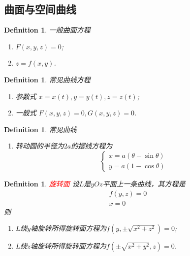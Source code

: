 \documentclass{article}
\newtheorem{definition}[theorem]{Definition}
\newcommand{\redt}[1]{\textcolor{red}{#1}}
\begin{document}
\subsection{曲面与空间曲线}

\begin{definition}
\rm 一般曲面方程
\begin{enumerate}
	\item $F(x,y,z) = 0$;
	\item $z = f(x,y)$.
\end{enumerate}
\end{definition}

\begin{definition}
\rm 常见曲线方程
\begin{enumerate}
	\item 参数式 $x = x(t),y = y(t),z = z(t)$;
	\item 一般式 $F(x,y,z) = 0, G(x,y,z) = 0$. 
\end{enumerate}
\end{definition}

\begin{definition}
\rm 常见曲线
\begin{enumerate}
	\item 转动圆的半径为$2a$的摆线方程为
	$$
		\left\{
		\begin{array}{ll}
		x = a(\theta-\sin\theta) \\
		y = a(1-\cos \theta)
		\end{array} \right.
	$$
\end{enumerate}
\end{definition}

\begin{definition}
\rm \redt{旋转面} 设$L$是$yOz$平面上一条曲线，其方程是
$$
\begin{array}{ll}
f(y,z) = 0 \\
x= 0
\end{array}
$$
则
\begin{enumerate}
	\item $L$绕$y$轴旋转所得旋转面方程为$f(y,\pm \sqrt{x^2+z^2}) = 0$;
	\item $L$绕$z$轴旋转所得旋转面方程为$f(\pm \sqrt{x^2 + y^2},z) = 0$. 
\end{enumerate}
\end{definition}
\end{document}
